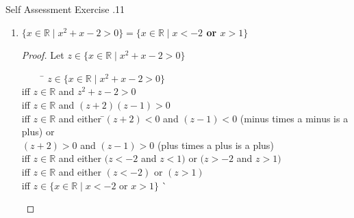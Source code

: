 \documentclass[../notes.tex]{subfiles}
\begin{document}
\begin{exercise}{Self Assessment Exercise \thechapter.11}
\begin{enumerate}
\begin{proof}
\begin{tabbing}
								iff \> $w \in \mathbb{Z}^{+}$ and \=$(1 < w < 4)$\\
								\> \> ($\mathbb{Z}^{+}$ as all the numbers are positive)\\
								iff \> $w \in \mathbb{Z}^{+}$ and $w \in \{2, 3\}$\\
								iff \> $w \in \{x \in \mathbb{Z}^{+} \mid x \in \{2, 3\}\}$\\
								iff \> $w \in \{x \in \mathbb{Z}^{+} \mid x$ is a prime factor of $6\}$ \` \qedhere
							\end{tabbing}
						\end{proof}
					\item \textbf{$\{x \in \mathbb{R} \mid x^{2} + x - 2 > 0\} = \{x \in \mathbb{R} \mid x < -2$ or $x > 1\}$}
						\begin{proof}
							Let $z \in \{x \in \mathbb{R} \mid x^{2} + x - 2 > 0\}$
							\begin{tabbing}
								$\qquad$ \= $z \in \{x \in \mathbb{R} \mid x^{2} + x - 2 > 0\}$\\
								iff \> $z \in \mathbb{R}$ and $z^{2} + z - 2 > 0$\\
								iff \> $z \in \mathbb{R}$ and $(z + 2)(z - 1) > 0$\\
								iff \> $z \in \mathbb{R}$ and either \=$(z + 2) < 0$ and $(z - 1) < 0$ (minus times a minus is a plus) or\\
								\> \> $(z + 2)> 0$ and $(z - 1) > 0$ (plus times a plus is a plus)\\
								iff \> $z \in \mathbb{R}$ and either $(z < -2$ and $z < 1)$ or $(z > -2$ and $z > 1)$\\
								iff \> $z \in \mathbb{R}$ and either $(z < -2)$ or $(z > 1)$\\
								iff \> $z \in \{x \in \mathbb{R} \mid x < -2$ or $x > 1\}$ \` \qedhere
							\end{tabbing}
						\end{proof}
				\end{enumerate}
			\end{exercise}
			\pagebreak
\end{document}
